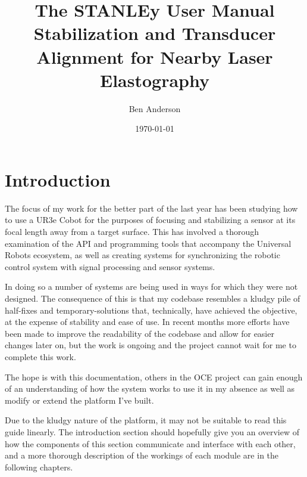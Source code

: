 \documentclass[11pt]{article}
\begin{document}
\newcommand\connect[2]{\path[draw,arrow] (#1) |- ($(#1)!1/2!(#2)$) -| (#2)}
\newcommand\ImageNode[3][]{
  \node[draw=arrowblue!80!black,line width=1pt,#1] (#2) {\texttt{[image: \#3]}};
}

\date{\today}
\author{Ben Anderson}
\title{The STANLEy User Manual \\[1ex] \large Stabilization and Transducer Alignment for Nearby Laser Elastography}
\maketitle
\tableofcontents
\parskip=6pt

\section{Introduction}\label{sec:intro}

The focus of my work for the better part of the last year has been studying how to use a UR3e Cobot for the purposes of focusing and stabilizing a sensor at its focal length away from a target surface. This has involved a thorough examination of the API and programming tools that accompany the Universal Robots ecosystem, as well as creating systems for synchronizing the robotic control system with signal processing and sensor systems.

In doing so a number of systems are being used in ways for which they were not designed. The consequence of this is that my codebase resembles a kludgy pile of half-fixes and temporary-solutions that, technically, have achieved the objective, at the expense of stability and ease of use.
In recent months more efforts have been made to improve the readability of the codebase and allow for easier changes later on, but the work is ongoing and the project cannot wait for me to complete this work.

The hope is with this documentation, others in the OCE project can gain enough of an understanding of how the system works to use it in my absence as well as modify or extend the platform I've built.

Due to the kludgy nature of the platform, it may not be suitable to read this guide linearly. The introduction section should hopefully give you an overview of how the components of this section communicate and interface with each other, and a more thorough description of the workings of each module are in the following chapters.
\end{document}
